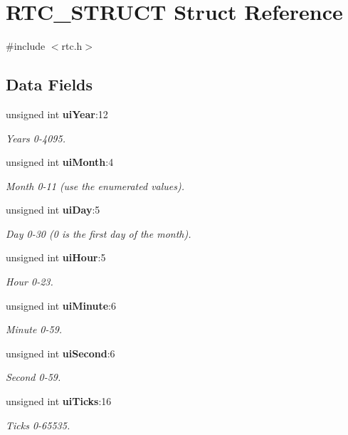 \section{RTC\_\-STRUCT Struct Reference}
\label{struct_r_t_c___s_t_r_u_c_t}


{\ttfamily \#include $<$rtc.h$>$}\subsection*{Data Fields}
\begin{DoxyCompactItemize}
\item 
unsigned int {\bf uiYear}:12
\begin{DoxyCompactList}\small\item\em Years 0-\/4095. \item\end{DoxyCompactList}\item 
unsigned int {\bf uiMonth}:4
\begin{DoxyCompactList}\small\item\em Month 0-\/11 (use the enumerated values). \item\end{DoxyCompactList}\item 
unsigned int {\bf uiDay}:5
\begin{DoxyCompactList}\small\item\em Day 0-\/30 (0 is the first day of the month). \item\end{DoxyCompactList}\item 
unsigned int {\bf uiHour}:5
\begin{DoxyCompactList}\small\item\em Hour 0-\/23. \item\end{DoxyCompactList}\item 
unsigned int {\bf uiMinute}:6
\begin{DoxyCompactList}\small\item\em Minute 0-\/59. \item\end{DoxyCompactList}\item 
unsigned int {\bf uiSecond}:6
\begin{DoxyCompactList}\small\item\em Second 0-\/59. \item\end{DoxyCompactList}\item 
unsigned int {\bf uiTicks}:16
\begin{DoxyCompactList}\small\item\em Ticks 0-\/65535. \item\end{DoxyCompactList}\end{DoxyCompactItemize}



